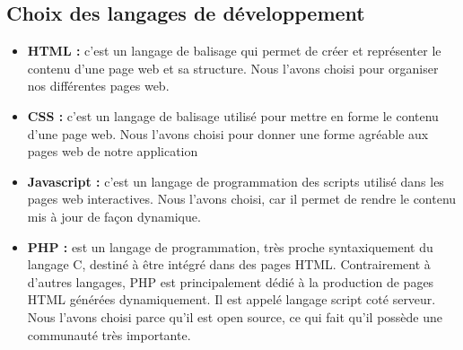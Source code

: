         \subsection[Choix des langages de développement]{Choix des langages de développement}
            \begin{itemize}
                \setlength{\itemsep}{0pt}
                \item [\ding{226}] \textbf{HTML :} c’est un langage de balisage qui permet de créer et représenter le
                contenu d’une page web et sa structure. Nous l’avons choisi pour organiser nos
                différentes pages web.
                \item [\ding{226}] \textbf{CSS :} c’est un langage de balisage utilisé pour mettre en forme le contenu d’une
                page web. Nous l’avons choisi pour donner une forme agréable aux pages web
                de notre application
                \item [\ding{226}] \textbf{Javascript :} c’est un langage de programmation des scripts utilisé dans les pages
                web interactives. Nous l’avons choisi, car il permet de rendre le contenu mis à
                jour de façon dynamique.
                \item [\ding{226}] \textbf{PHP :}  est un langage de programmation, très proche syntaxiquement du langage C,
                destiné à être intégré dans des pages HTML. Contrairement à d’autres langages, PHP
                est principalement dédié à la production de pages HTML générées dynamiquement. \cite*{rigaux2005pratique} Il
                est appelé langage script coté serveur. Nous l’avons choisi parce qu’il est
                open source, ce qui fait qu’il possède une communauté très importante.
            \end{itemize}
